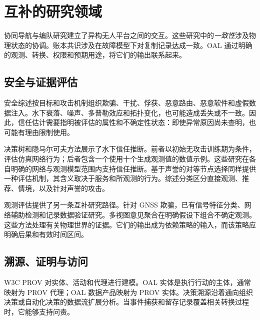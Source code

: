 \section{互补的研究领域}

协同导航与编队研究建立了异构无人平台之间的交互\citep{wu2020cooperative,ke2022cooperative,xue2021distributed,liu2023formation}。这些研究中的\emph{一致性}涉及物理状态的协调。账本共识涉及在故障模型下对复制记录达成一致。OAL 通过明确的观测、转换、权限和预期用途，将它们的输出联系起来。

\subsection{安全与证据评估}

安全综述按目标和攻击机制组织欺骗、干扰、俘获、恶意路由、恶意软件和虚假数据注入\citep{yahuza2021internet,mekdad2023survey,jiang2019securing,adam2024state}。水下衰落、噪声、多普勒效应和拓扑变化，也可能造成丢失或不一致\citep{ali2020recent,jouhari2019underwater,mohsan2022towards}。因此，信任估计需要指明被评估的属性和不确定性状态：即使异常原因尚未查明，也可能有理由限制使用。

决策树和隐马尔可夫方法展示了水下信任推断\citep{jiang2020dynamic,arifeen2020hidden}。前者以初始无攻击训练期为条件，评估仿真网络行为；后者包含一个使用十个生成观测值的数值示例。这些研究在各自明确的网络与观测模型范围内支持信任推断。基于声誉的对等节点选择\citep{kamvar2003eigentrust}同样提供一种评估机制，其含义取决于服务和所观测的行为。综述分类区分直接观测、推荐、情境，以及针对声誉的攻击\citep{ahmed2019trust,aaqib2023iot,junior2021survey,liu2023survey}。

观测评估提供了另一条互补研究路径。针对 GNSS 欺骗，已有信号特征分类、网络辅助检测和记录数据验证研究\citep{shafique2021detecting,dang2022deep,semanjski2020use}。多视图意见聚合在明确假设下组合不确定观测\citep{liu2022trusted}。这些方法处理有关物理世界的证据。它们的输出成为依赖策略的输入，而该策略应明确后果和有效时间区间。

\subsection{溯源、证明与访问}

W3C PROV 对实体、活动和代理进行建模\citep{w3c2013provdm,w3c2013provo}。OAL 实体是执行行动的主体，通常映射为 PROV 代理；OAL 数据产品映射为 PROV 实体。决策溯源沿着通向组织决策或自动化决策的数据流扩展分析\citep{singh2019decision}。当事件捕获和留存记录覆盖相关转换过程时，它能够支持问责。

